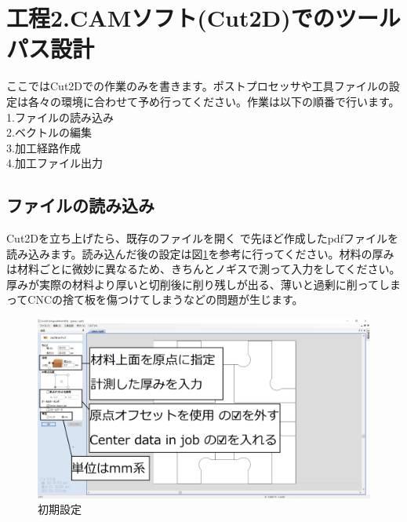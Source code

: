 \documentclass[b5paper, 9pt, twocolumn, titlepage,openany]{jsbook}%
\begin{document}


\clearpage
\section{工程2.CAMソフト(Cut2D)でのツールパス設計}
ここではCut2Dでの作業のみを書きます。ポストプロセッサや工具ファイルの設定は各々の環境に合わせて予め行ってください。作業は以下の順番で行います。
  1.ファイルの読み込み\\
  2.ベクトルの編集\\
  3.加工経路作成\\
  4.加工ファイル出力\\

\subsection{ファイルの読み込み}
Cut2Dを立ち上げたら、既存のファイルを開く で先ほど作成したpdfファイルを読み込みます。読み込んだ後の設定は図\ref{first_setting}を参考に行ってください。材料の厚みは材料ごとに微妙に異なるため、きちんとノギスで測って入力をしてください。厚みが実際の材料より厚いと切削後に削り残しが出る、薄いと過剰に削ってしまってCNCの捨て板を傷つけてしまうなどの問題が生じます。\\

\begin{figure}[tbh]
  \begin{center}
    \begin{minipage}{1.0\columnwidth}
      \includegraphics[width=\columnwidth]{first_setting.png}
    \end{minipage}
    \caption{初期設定    \label{first_setting}}
  \end{center}
\end{figure}
\end{document}
